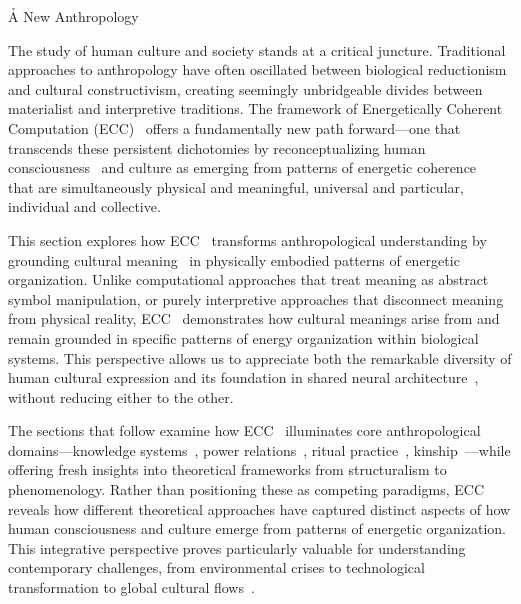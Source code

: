 \h{A New Anthropology}


\begin{refsection}

    The study of human culture and society stands at a critical juncture. Traditional approaches to anthropology have often oscillated between biological reductionism and cultural constructivism, creating seemingly unbridgeable divides between materialist and interpretive traditions. The framework of Energetically Coherent Computation (ECC)~ offers a fundamentally new path forward---one that transcends these persistent dichotomies by reconceptualizing human consciousness~ and culture as emerging from patterns of energetic coherence~ that are simultaneously physical and meaningful, universal and particular, individual and collective.

    This section explores how ECC~ transforms anthropological understanding by grounding cultural meaning~ in physically embodied patterns of energetic organization. Unlike computational approaches that treat meaning as abstract symbol manipulation, or purely interpretive approaches that disconnect meaning from physical reality, ECC~ demonstrates how cultural meanings arise from and remain grounded in specific patterns of energy organization within biological systems. This perspective allows us to appreciate both the remarkable diversity of human cultural expression and its foundation in shared neural architecture~, without reducing either to the other.

    The sections that follow examine how ECC~ illuminates core anthropological domains---knowledge systems~, power relations~, ritual practice~, kinship~---while offering fresh insights into theoretical frameworks from structuralism to phenomenology. Rather than positioning these as competing paradigms, ECC~ reveals how different theoretical approaches have captured distinct aspects of how human consciousness and culture emerge from patterns of energetic organization. This integrative perspective proves particularly valuable for understanding contemporary challenges, from environmental crises to technological transformation to global cultural flows~.


\end{refsection}
